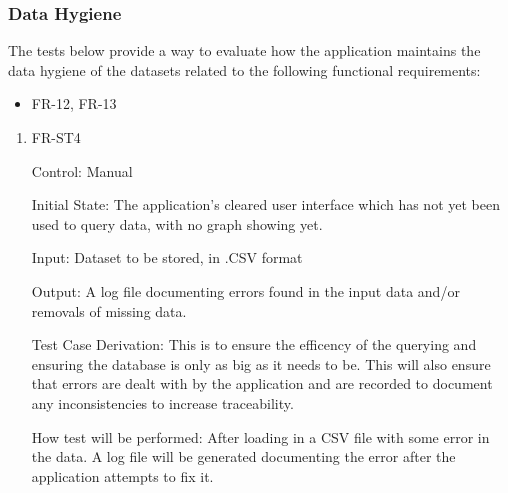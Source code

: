 \documentclass[12pt, titlepage]{article}
\begin{document}
      \subsubsection{Data Hygiene}
      The tests below provide a way to evaluate how the application maintains
      the data hygiene of the datasets related to the following functional
      requirements:
      \begin{itemize}
        \item FR-12, FR-13
      \end{itemize}
        \begin{enumerate}
        
          \item{FR-ST4}
          
          Control: Manual
                    
          Initial State: The application's cleared user interface which has not
          yet been used to query data, with no graph showing yet.
                    
          Input: Dataset to be stored, in .CSV format
                    
          Output: A log file documenting errors found in the input data and/or
          removals of missing data.
          
          Test Case Derivation: This is to ensure the efficency of the querying
          and ensuring the database is only as big as it needs to be. This will
          also ensure that errors are dealt with by the application and are
          recorded to document any inconsistencies to increase traceability.
                    
          How test will be performed: After loading in a CSV file with some
          error in the data. A log file will be generated documenting the error
          after the application attempts to fix it. 
          
          \end{enumerate}
\end{document}
